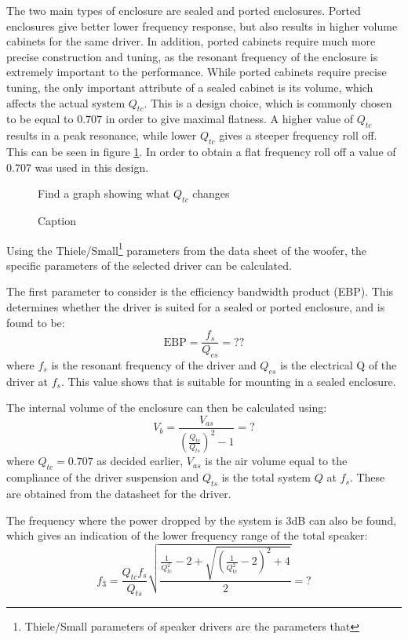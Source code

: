 \documentclass[main.tex]{subfiles}
\begin{document}
The two main types of enclosure are sealed and ported enclosures.
Ported enclosures give better lower frequency response, but also results in higher volume cabinets for the same driver.
In addition, ported cabinets require much more precise construction and tuning, as the resonant frequency of the enclosure is extremely important to the performance.
While ported cabinets require precise tuning, the only important attribute of a sealed cabinet is its volume, which affects the actual system $Q_{tc}$.
This is a design choice, which is commonly chosen to be equal to $0.707$ in order to give maximal flatness.
A higher value of $Q_{tc}$ results in a peak resonance, while lower $Q_{tc}$ gives a steeper frequency roll off.
This can be seen in figure \ref{fig:qtcplot}.
In order to obtain a flat frequency roll off a value of 0.707 was used in this design.
\begin{figure}
    \centering
    Find a graph showing what $Q_{tc}$ changes
    \caption{Caption}
    \label{fig:qtcplot}
\end{figure}

Using the Thiele/Small\footnote{Thiele/Small parameters of speaker drivers are the parameters that } parameters from the data sheet of the woofer, the specific parameters of the selected driver can be calculated.

The first parameter to consider is the efficiency bandwidth product (EBP).
This determines whether the driver is suited for a sealed or ported enclosure, and is found to be:
\begin{equation}
    \mbox{EBP} = \frac{f_s}{Q_{es}} = ??
\end{equation}
where $f_s$ is the resonant frequency of the driver and $Q_{es}$ is the electrical Q of the driver at $f_s$.
This value shows that is suitable for mounting in a sealed enclosure.

The internal volume of the enclosure can then be calculated using:
\begin{equation}
    V_b = \frac{V_{as}}{\left(\frac{Q_{tc}}{Q_{ts}}\right)^2-1}=?
\end{equation}
where $Q_{tc}=0.707$ as decided earlier, $V_{as}$ is the air volume equal to the compliance of the driver suspension and $Q_{ts}$ is the total system $Q$ at $f_s$.
These are obtained from the datasheet for the driver.

The frequency where the power dropped by the system is 3dB can also be found, which gives an indication of the lower frequency range of the total speaker:
\begin{equation}
    f_3 = \frac{Q_{tc}f_s}{Q_{ts}}\sqrt{\frac{\frac{1}{Q_{tc}^2}-2+\sqrt{\left(\frac{1}{Q_{tc}^2}-2\right)^2+4}}{2}}=?
\end{equation}
\end{document}

